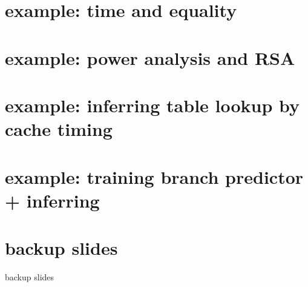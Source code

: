 \date{}
\title{}
\date{}

\begin{frame}
    \titlepage
\end{frame}
\section{example: time and equality}

\section{example: power analysis and RSA}

\section{example: inferring table lookup by cache timing}

\section{example: training branch predictor + inferring}


\section{backup slides}
\begin{frame}{backup slides}
\end{frame}


